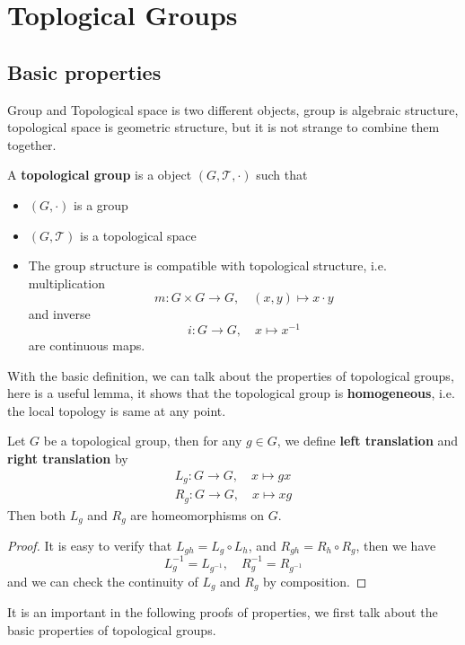 \section{Toplogical Groups}

\subsection{Basic properties}
Group and Topological space is two different objects, group is algebraic structure, topological space is geometric structure, but it is not strange to combine them together.

\begin{definition}
A \textbf{topological group} is a object \((G,\mathcal{T},\cdot)\) such that
\begin{itemize}
    \item \((G,\cdot)\) is a group
    \item \((G,\mathcal{T})\) is a topological space
    \item The group structure is compatible with topological structure, i.e. multiplication 
    \[m: G \times G \to G, \quad (x,y) \mapsto x \cdot y\]
    and inverse \[i: G \to G, \quad x \mapsto x^{-1}\]
    are continuous maps.
\end{itemize} 
\end{definition}

With the basic definition, we can talk about the properties of topological groups, here is a useful lemma, it shows that the topological group is \textbf{homogeneous}, i.e. the local topology is same at any point.
\begin{lemma}
    Let \(G\) be a topological group, then for any \(g \in G\), we define \textbf{left translation} and \textbf{right translation} by
    \begin{align*}
    L_g: G \to G, \quad x \mapsto gx\\
    R_g: G \to G, \quad x \mapsto xg
    \end{align*}
    Then both \(L_g\) and \(R_g\) are homeomorphisms on \(G\).
\end{lemma}
\begin{proof}
    It is easy to verify that \(L_{gh} = L_g \circ L_h\), and \(R_{gh} = R_h \circ R_g\), then we have
    \[L_g^{-1} = L_{g^{-1}}, \quad R_{g}^{-1} = R_{g^{-1}}\]
    and we can check the continuity of \(L_g\) and \(R_g\) by composition.
\end{proof}

It is an important in the following proofs of properties, we first talk about the basic properties of topological groups.

